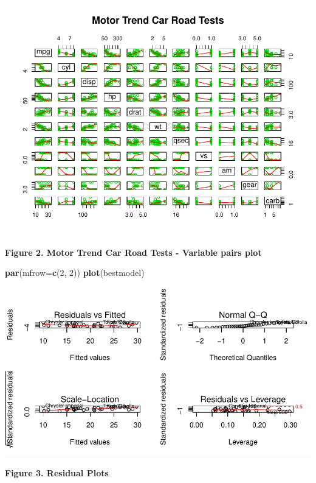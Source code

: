 \documentclass[]{article}
\newenvironment{Shaded}{\begin{snugshade}}{\end{snugshade}}
\newcommand{\KeywordTok}[1]{\textcolor[rgb]{0.13,0.29,0.53}{\textbf{{#1}}}}
\newcommand{\DataTypeTok}[1]{\textcolor[rgb]{0.13,0.29,0.53}{{#1}}}
\newcommand{\DecValTok}[1]{\textcolor[rgb]{0.00,0.00,0.81}{{#1}}}
\newcommand{\NormalTok}[1]{{#1}}
\begin{document}
\includegraphics{./Regression_Models_-_Course_Project_5_pages_files/figure-latex/unnamed-chunk-5.pdf}

\textbf{Figure 2. Motor Trend Car Road Tests - Variable pairs plot}

\begin{Shaded}
\begin{Highlighting}[]
\KeywordTok{par}\NormalTok{(}\DataTypeTok{mfrow=}\KeywordTok{c}\NormalTok{(}\DecValTok{2}\NormalTok{, }\DecValTok{2}\NormalTok{))}
\KeywordTok{plot}\NormalTok{(bestmodel)}
\end{Highlighting}
\end{Shaded}

\includegraphics{./Regression_Models_-_Course_Project_5_pages_files/figure-latex/unnamed-chunk-6.pdf}

\textbf{Figure 3. Residual Plots}
\end{document}

